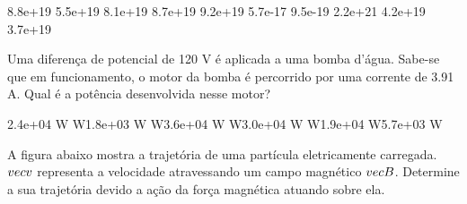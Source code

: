 \documentclass[12pt, addpoints]{exam}
\begin{document}
\begin{questions}
\begin{multicols*}{2}
\begin{oneparchoices}
\choice 8.8e+19 \choice 5.5e+19 \choice 8.1e+19 \choice 8.7e+19 \choice 9.2e+19 \choice 5.7e-17 \choice 9.5e-19 \choice 2.2e+21 \choice 4.2e+19 \choice 3.7e+19 
\end{oneparchoices}\question Uma diferença de potencial de 120 V é aplicada a uma bomba d’água. Sabe-se que em funcionamento, o motor da bomba é percorrido por uma corrente de    3.91 A. Qual é a potência desenvolvida nesse motor?

\begin{oneparchoices}
\choice 2.4e+04 W W\choice 1.8e+03 W W\choice 3.6e+04 W W\choice 3.0e+04 W W\choice 1.9e+04 W\choice 5.7e+03 W
\end{oneparchoices}\question A ﬁgura abaixo mostra a trajetória de uma partícula eletricamente carregada. $\\vec{{v}}$ representa a velocidade atravessando um campo magnético $\\vec{{B}}$. Determine a sua trajetória devido a ação da força magnética atuando sobre ela.
        
        \begin{center}
            \begin{minipage}[c]{0.5\linewidth}
            \end{minipage}
        \end{center}


\end{multicols*}
\end{questions}
\end{document}
